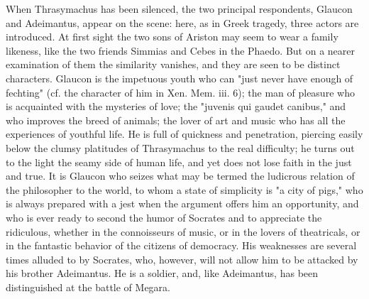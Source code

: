 When Thrasymachus has been silenced, the two principal respondents, Glaucon and Adeimantus, appear on the scene: here, as in Greek tragedy, three actors are introduced. At first sight the two sons of Ariston may seem to wear a family likeness, like the two friends Simmias and Cebes in the Phaedo. But on a nearer examination of them the similarity vanishes, and they are seen to be distinct characters. Glaucon is the impetuous youth who can "just never have enough of fechting" (cf. the character of him in Xen. Mem. iii. 6); the man of pleasure who is acquainted with the mysteries of love; the "juvenis qui gaudet canibus," and who improves the breed of animals; the lover of art and music who has all the experiences of youthful life. He is full of quickness and penetration, piercing easily below the clumsy platitudes of Thrasymachus to the real difficulty; he turns out to the light the seamy side of human life, and yet does not lose faith in the just and true. It is Glaucon who seizes what may be termed the ludicrous relation of the philosopher to the world, to whom a state of simplicity is "a city of pigs," who is always prepared with a jest when the argument offers him an opportunity, and who is ever ready to second the humor of Socrates and to appreciate the ridiculous, whether in the connoisseurs of music, or in the lovers of theatricals, or in the fantastic behavior of the citizens of democracy. His weaknesses are several times alluded to by Socrates, who, however, will not allow him to be attacked by his brother Adeimantus. He is a soldier, and, like Adeimantus, has been distinguished at the battle of Megara.

